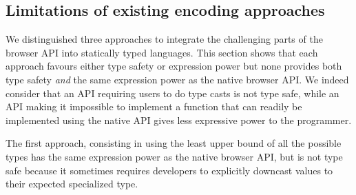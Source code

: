 \documentclass{llncs}
\newcommand{\jscode}[1]{\lstinline[language=JavaScript]|#1|}
\begin{document}
% 

\subsection{Limitations of existing encoding approaches}
\label{sec-limitations}

We distinguished three approaches to integrate the challenging parts of the browser API into statically typed languages. This section shows that each approach favours either type safety or expression power but none provides both type safety \emph{and} the same expression power as the native browser API. We indeed  consider that an API requiring users to do type casts is not type safe, while an API making it impossible to implement a function that can readily be implemented using the native API gives less expressive power to the programmer.

The first approach, consisting in using the least upper bound of all the possible types has the same expression power as the native browser API, but is not type safe because it sometimes requires developers to explicitly downcast values to their expected specialized type.
\end{document}
